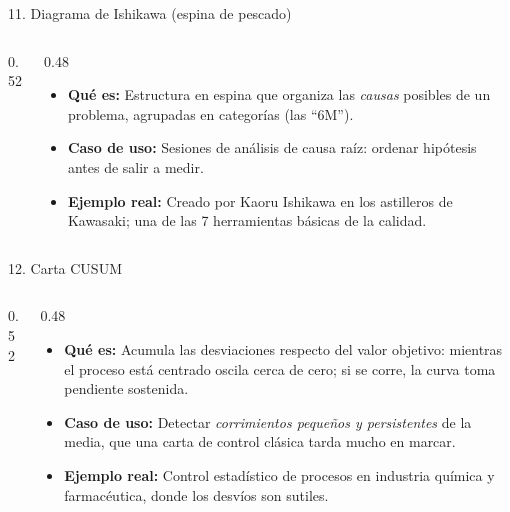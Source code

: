 \documentclass[aspectratio=169,9pt]{beamer}
\newcommand{\ficha}[3]{%
\begin{itemize}
\item \textbf{Qué es:} #1
\item \textbf{Caso de uso:} #2
\item \textbf{Ejemplo real:} #3
\end{itemize}}
\begin{document}
\begin{frame}{11. Diagrama de Ishikawa (espina de pescado)}
\begin{columns}[T]
\begin{column}{0.52\textwidth}
\centering
{}
\end{column}
\begin{column}{0.48\textwidth}
\ficha{Estructura en espina que organiza las \emph{causas} posibles de un problema, agrupadas en categorías (las ``6M'').}
{Sesiones de análisis de causa raíz: ordenar hipótesis antes de salir a medir.}
{Creado por Kaoru Ishikawa en los astilleros de Kawasaki; una de las 7 herramientas básicas de la calidad.}
\end{column}
\end{columns}
\end{frame}

\begin{frame}{12. Carta CUSUM}
\begin{columns}[T]
\begin{column}{0.52\textwidth}
\centering
{}
\end{column}
\begin{column}{0.48\textwidth}
\ficha{Acumula las desviaciones respecto del valor objetivo: mientras el proceso está centrado oscila cerca de cero; si se corre, la curva toma pendiente sostenida.}
{Detectar \emph{corrimientos pequeños y persistentes} de la media, que una carta de control clásica tarda mucho en marcar.}
{Control estadístico de procesos en industria química y farmacéutica, donde los desvíos son sutiles.}
\end{column}
\end{columns}
\end{frame}
\end{document}
